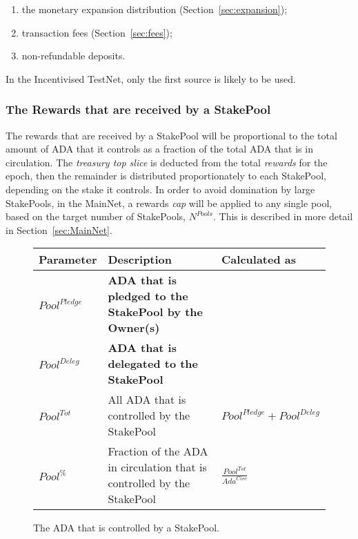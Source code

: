 \documentclass[11pt,a4paper,dvipsnames,twosided,final]{article}
\newcommand{\ada}{ADA{}}
\begin{document}
\begin{enumerate}
\item
  the monetary expansion distribution (Section~\ref{sec:expansion});
\item
  transaction fees (Section~\ref{sec:fees});
\item
  non-refundable deposits.
\end{enumerate}

\noindent
In the Incentivised TestNet, only the first source is likely to be used.

\subsubsection*{The Rewards that are received by a StakePool}

The rewards that are received by a StakePool will be proportional to the total amount of \ada{} that it controls
as a fraction of the total \ada{} that is in circulation.  The \emph{treasury top slice} is deducted from the total \emph{rewards}
for the epoch, then the remainder is distributed proportionately to each StakePool, depending on the stake it controls.  In order to avoid domination by large StakePools,
in the MainNet, a rewards \emph{cap} will be applied to any single pool, based on the target number of StakePools, $N^{\textit{Pools}}$.
This is described in more detail in Section~\ref{sec:MainNet}.

\clearpage
\begin{figure}[h!]
\begin{center}
\begin{tabular}{||l|p{9cm}|l||}
  \hline \hline
\textbf{Parameter} & \textbf{Description} & \textbf{Calculated as} \\\hline
\textbf{\color{red} ${\textit{Pool}}^\textit{Pledge}$} & \textbf{\color{red} \ada{} that is pledged to the StakePool by the Owner(s)} & \\\hline
\textbf{\color{blue} ${\textit{Pool}}^\textit{Deleg}$} & \textbf{\color{blue}  \ada{} that is delegated to the StakePool} & \\\hline
${\textit{Pool}}^{Tot}$ & All \ada{} that is controlled by the StakePool & ${\textit{Pool}}^\textit{Pledge} + {\textit{Pool}}^\textit{Deleg}$ \\\hline
${\textit{Pool}}^\%$ & Fraction of the \ada{} in circulation that is controlled by the StakePool & {\large $\frac{{\textit{Pool}}^{Tot}}{\textit{Ada}^{\textit{Circ}}}$} \\\hline
  \hline
\end{tabular}
\end{center}
\caption{The \ada{} that is controlled by a StakePool.}
\end{figure}
\end{document}
